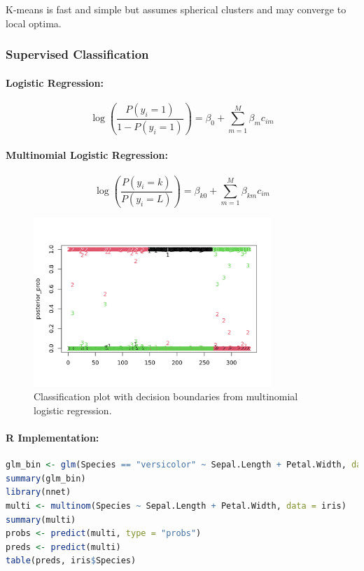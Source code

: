 \documentclass[11pt,a4paper]{article}
\begin{document}
\begin{tipbox}
K-means is fast and simple but assumes spherical clusters and may converge to local optima.
\end{tipbox}

\subsubsection{Supervised Classification}

\paragraph{Logistic Regression:}
\begin{equation}
\log\left(\frac{P(y_i = 1)}{1 - P(y_i = 1)}\right) = \beta_0 + \sum_{m=1}^M \beta_m c_{im}
\end{equation}

\paragraph{Multinomial Logistic Regression:}
\begin{equation}
\log\left(\frac{P(y_i = k)}{P(y_i = L)}\right) = \beta_{k0} + \sum_{m=1}^M \beta_{km}c_{im}
\end{equation}

\begin{figure}[htb]
    \centering
    \includegraphics[width=0.8\textwidth]{classification-boundries.png}
    \caption{Classification plot with decision boundaries from multinomial logistic regression.}
    \label{fig:classification-boundaries}
\end{figure}

\paragraph{R Implementation:}
\begin{lstlisting}[language=R]
glm_bin <- glm(Species == "versicolor" ~ Sepal.Length + Petal.Width, data = iris, family = "binomial")
summary(glm_bin)
library(nnet)
multi <- multinom(Species ~ Sepal.Length + Petal.Width, data = iris)
summary(multi)
probs <- predict(multi, type = "probs")
preds <- predict(multi)
table(preds, iris$Species)
\end{lstlisting}
\end{document}

